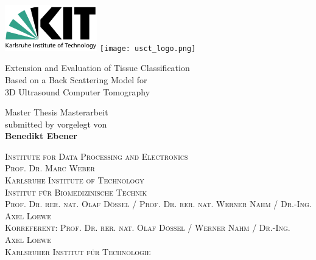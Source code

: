 \begin{titlingpage}
    \linespread{1.2}
\parindent0cm

\raggedright{ \includegraphics[width=4cm]{Graphics/KITlogo.pdf} \hfill \texttt{[image: usct\_logo.png]} }

   \vspace{3cm}


\begin{minipage}[c]{15.5cm}
\begin{center}
   \begin{huge}
   \hspace{-1cm}
     Extension and Evaluation of Tissue Classification\\
   \hspace{-1cm}
     Based on a Back Scattering Model for\\
   \hspace{-1cm}
      3D Ultrasound Computer Tomography\\
   \end{huge}
\end{center}
\end{minipage}
\vfill
\begin{minipage}[c]{15.5cm}
   \begin{center}

    {\Large
     \ifenglish
     Master Thesis
 	\else
    Masterarbeit
	\fi
	}\\

    \vspace{0.5cm}
     {\large
      \ifenglish
        submitted by
      \else
        vorgelegt von
      \fi
      }\\
    \vspace{0.5cm}
     \textbf{\Large Benedikt Ebener}
   \vspace{5cm}



 \textsc{
 \ifenglish
   Institute for Data Processing and Electronics\\
   Prof. Dr. Marc Weber\\
   Karlsruhe Institute of Technology\\
 \else
    Institut f\"ur Biomedizinische Technik\\
    Prof. Dr. rer. nat. Olaf D\"ossel / Prof. Dr. rer. nat. Werner Nahm / Dr.-Ing. Axel Loewe\\
    Korreferent: Prof. Dr. rer. nat. Olaf D\"ossel / Werner Nahm / Dr.-Ing. Axel Loewe\\
    Karlsruher Institut f\"ur Technologie\\
 \fi
\the\year\\
 }


\end{center}
\end{minipage}
\end{titlingpage}
